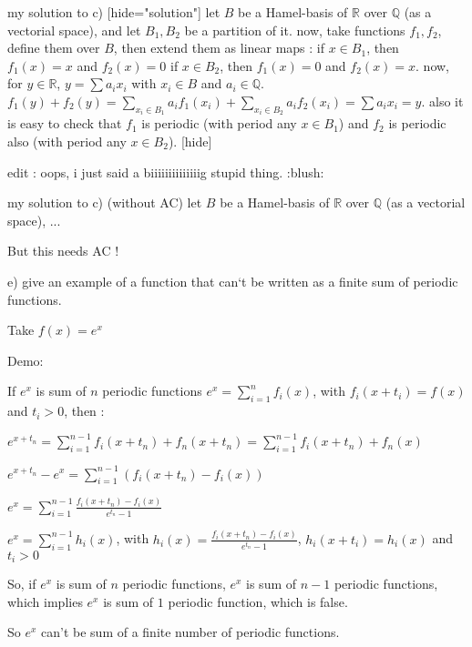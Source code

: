 \begin{solution}
	my solution to c)
[hide="solution"]
let $B$ be a Hamel-basis of $\mathbb{R}$ over $\mathbb{Q}$ (as a vectorial space), and let $B_{1},B_{2}$ be a partition of it.
now, take functions $f_{1},f_{2}$, define them over $B$, then extend them as linear maps :
if $x\in B_{1}$, then $f_{1}(x)=x$ and $f_{2}(x)=0$
if $x\in B_{2}$, then $f_{1}(x)=0$ and $f_{2}(x)=x$.
now, for $y\in \mathbb{R}$, $y=\sum a_{i}x_{i}$ with $x_{i}\in B$ and $a_{i}\in \mathbb{Q}$.
$f_{1}(y)+f_{2}(y)=\sum_{x_{i}\in B_{1}}a_{i}f_{1}(x_{i})+\sum_{x_{i}\in B_{2}}a_{i}f_{2}(x_{i}) = \sum a_{i}x_{i}= y$.
also it is easy to check that $f_{1}$ is periodic (with period any $x\in B_{1}$) and $f_{2}$ is periodic also (with period any $x\in B_{2}$).
[\/hide]

edit : oops, i just said a biiiiiiiiiiiiiig stupid thing.  :blush:
\end{solution}



\begin{solution}
	\begin{tcolorbox}my solution to c) (without AC)
let $B$ be a Hamel-basis of $\mathbb{R}$ over $\mathbb{Q}$ (as a vectorial space), ...
\end{tcolorbox}

But this needs AC !
\end{solution}



\begin{solution}
	\begin{tcolorbox} e) give an example of a function that can`t be written as a finite sum of periodic functions.\end{tcolorbox}

Take $f(x)=e^{x}$

Demo:

If $e^{x}$ is sum of $n$ periodic functions $e^{x}=\sum_{i=1}^{n}f_{i}(x)$, with $f_{i}(x+t_{i})=f(x)$ and $t_{i}>0$, then :

$e^{x+t_{n}}=\sum_{i=1}^{n-1}f_{i}(x+t_{n})+f_{n}(x+t_{n})=\sum_{i=1}^{n-1}f_{i}(x+t_{n})+f_{n}(x)$

$e^{x+t_{n}}-e^{x}= \sum_{i=1}^{n-1}(f_{i}(x+t_{n})-f_{i}(x))$

$e^{x}=\sum_{i=1}^{n-1}\frac{f_{i}(x+t_{n})-f_{i}(x)}{e^{t_{n}}-1}$

$e^{x}=\sum_{i=1}^{n-1}h_{i}(x)$, with $h_{i}(x)=\frac{f_{i}(x+t_{n})-f_{i}(x)}{e^{t_{n}}-1}$, $h_{i}(x+t_{i})=h_{i}(x)$ and $t_{i}>0$

So, if $e^{x}$ is sum of $n$ periodic functions, $e^{x}$ is sum of $n-1$ periodic functions, which implies $e^{x}$ is sum of $1$ periodic function, which is false.

So $e^{x}$ can't be sum of a finite number of periodic functions.
\end{solution}



